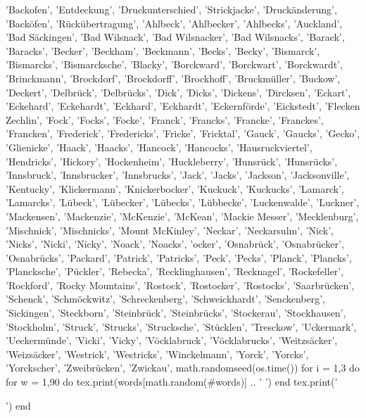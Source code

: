 \documentclass{article}
\begin{document}
\begin{multicols}{5}
{{      'Backofen',%
      'Entdeckung', 'Druckunterschied',%
      'Strickjacke',%
      'Druckänderung',%
      'Backöfen',%
      'Rückübertragung',%
      'Ahlbeck', 'Ahlbecker', 'Ahlbecks',
      'Auckland',
      'Bad Säckingen',
      'Bad Wilsnack', 'Bad Wilsnacker', 'Bad Wilsnacks',
      'Barack', 'Baracks',
      'Becker', 'Beckham', 'Beckmann', 'Becks', 'Becky',
      'Bismarck', 'Bismarcks', 'Bismarcksche',
      'Blacky',
      'Borckward', 'Borckwart', 'Borckwardt',
      'Brinckmann',
      'Brockdorf', 'Brockdorff', 'Brockhoff',
      'Bruckmüller',
      'Buckow',
      'Deckert',
      'Delbrück', 'Delbrücks',
      'Dick', 'Dicks', 'Dickens',
      'Dircksen',
      'Eckart', 'Eckehard', 'Eckehardt', 'Eckhard', 'Eckhardt',
      'Eckernförde',
      'Eickstedt',
      'Flecken Zechlin',
      'Fock', 'Focks', 'Focke',
      'Franck', 'Francks', 'Francke', 'Franckes', 'Francken',
      'Frederick', 'Fredericks',
      'Fricke', 'Fricktal',
      'Gauck', 'Gaucks',
      'Gecko',
      'Glienicke',
      'Haack', 'Haacks',
      'Hancock', 'Hancocks',
      'Hausruckviertel',
      'Hendricks',
      'Hickory',
      'Hockenheim',
      'Huckleberry',
      'Hunsrück', 'Hunsrücks',
      'Innsbruck', 'Innsbrucker', 'Innsbrucks',
      'Jack', 'Jacks', 'Jackson', 'Jacksonville',
      'Kentucky',
      'Klickermann',
      'Knickerbocker',
      'Kuckuck', 'Kuckucks',
      'Lamarck', 'Lamarcks',
      'Lübeck', 'Lübecker', 'Lübecks', 'Lübbecke',
      'Luckenwalde', 'Luckner',
      'Mackensen',
      'Mackenzie', 'McKenzie',
      'McKean',
      'Mackie Messer',
      'Mecklenburg',
      'Mischnick', 'Mischnicks',
      'Mount McKinley',
      'Neckar', 'Neckarsulm',
      'Nick', 'Nicks', 'Nicki', 'Nicky',
      'Noack', 'Noacks',
      'ocker',
      'Osnabrück', 'Osnabrücker', 'Osnabrücks',
      'Packard',
      'Patrick', 'Patricks',
      'Peck', 'Pecks',
      'Planck', 'Plancks', 'Plancksche',
      'Pückler',
      'Rebecka',
      'Recklinghausen', 'Recknagel',
      'Rockefeller', 'Rockford', 'Rocky Mountains',
      'Rostock', 'Rostocker', 'Rostocks',
      'Saarbrücken',
      'Schenck',
      'Schmöckwitz',
      'Schreckenberg',
      'Schweickhardt',
      'Senckenberg',
      'Sickingen',
      'Steckborn',
      'Steinbrück', 'Steinbrücks',
      'Stockerau', 'Stockhausen', 'Stockholm',
      'Struck', 'Strucks', 'Strucksche',
      'Stücklen',
      'Tresckow',
      'Uckermark', 'Ueckermünde',
      'Vicki', 'Vicky',
      'Vöcklabruck', 'Vöcklabrucks',
      'Weitzsäcker', 'Weizsäcker',
      'Westrick', 'Westricks',
      'Winckelmann',
      'Yorck', 'Yorcks', 'Yorckscher',
      'Zweibrücken',
      'Zwickau',
   }
   math.randomseed(os.time())
   for i = 1,3 do
      for w = 1,90 do
         tex.print(words[math.random(#words)] .. ' ')
      end
      tex.print('\par')
   end
}
\end{multicols}
\end{document}
